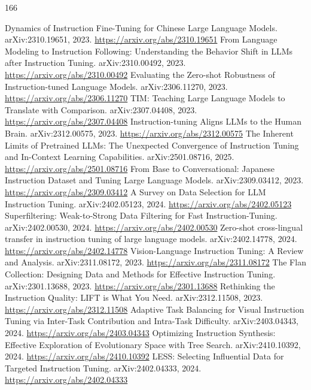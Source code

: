 \documentclass[11pt]{article}
\begin{document}
\begin{thebibliography}{166}
 Dynamics of Instruction Fine-Tuning for Chinese Large Language Models. arXiv:2310.19651, 2023. \url{https://arxiv.org/abs/2310.19651}
 From Language Modeling to Instruction Following: Understanding the Behavior Shift in LLMs after Instruction Tuning. arXiv:2310.00492, 2023. \url{https://arxiv.org/abs/2310.00492}
 Evaluating the Zero-shot Robustness of Instruction-tuned Language Models. arXiv:2306.11270, 2023. \url{https://arxiv.org/abs/2306.11270}
 TIM: Teaching Large Language Models to Translate with Comparison. arXiv:2307.04408, 2023. \url{https://arxiv.org/abs/2307.04408}
 Instruction-tuning Aligns LLMs to the Human Brain. arXiv:2312.00575, 2023. \url{https://arxiv.org/abs/2312.00575}
 The Inherent Limits of Pretrained LLMs: The Unexpected Convergence of Instruction Tuning and In-Context Learning Capabilities. arXiv:2501.08716, 2025. \url{https://arxiv.org/abs/2501.08716}
 From Base to Conversational: Japanese Instruction Dataset and Tuning Large Language Models. arXiv:2309.03412, 2023. \url{https://arxiv.org/abs/2309.03412}
 A Survey on Data Selection for LLM Instruction Tuning. arXiv:2402.05123, 2024. \url{https://arxiv.org/abs/2402.05123}
 Superfiltering: Weak-to-Strong Data Filtering for Fast Instruction-Tuning. arXiv:2402.00530, 2024. \url{https://arxiv.org/abs/2402.00530}
 Zero-shot cross-lingual transfer in instruction tuning of large language models. arXiv:2402.14778, 2024. \url{https://arxiv.org/abs/2402.14778}
 Vision-Language Instruction Tuning: A Review and Analysis. arXiv:2311.08172, 2023. \url{https://arxiv.org/abs/2311.08172}
 The Flan Collection: Designing Data and Methods for Effective Instruction Tuning. arXiv:2301.13688, 2023. \url{https://arxiv.org/abs/2301.13688}
 Rethinking the Instruction Quality: LIFT is What You Need. arXiv:2312.11508, 2023. \url{https://arxiv.org/abs/2312.11508}
 Adaptive Task Balancing for Visual Instruction Tuning via Inter-Task Contribution and Intra-Task Difficulty. arXiv:2403.04343, 2024. \url{https://arxiv.org/abs/2403.04343}
 Optimizing Instruction Synthesis: Effective Exploration of Evolutionary Space with Tree Search. arXiv:2410.10392, 2024. \url{https://arxiv.org/abs/2410.10392}
 LESS: Selecting Influential Data for Targeted Instruction Tuning. arXiv:2402.04333, 2024. \url{https://arxiv.org/abs/2402.04333}

\end{thebibliography}
\end{document}
